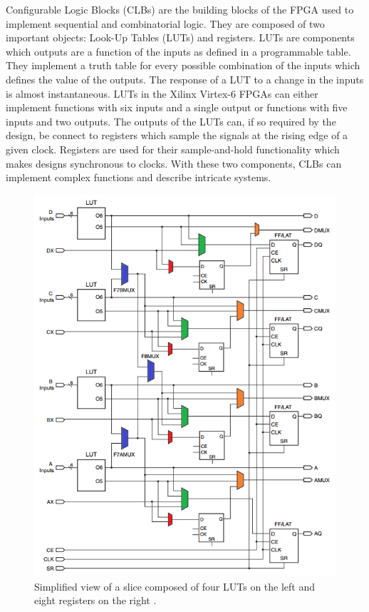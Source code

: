       Configurable Logic Blocks (CLBs) \cite{VIRTEX-CLB} are the building blocks of the FPGA used to implement sequential and combinatorial logic. They are composed of two important objects: Look-Up Tables (LUTs) and registers. LUTs are components which outputs are a function of the inputs as defined in a programmable table. They implement a truth table for every possible combination of the inputs which defines the value of the outputs. The response of a LUT to a change in the inputs is almost instantaneous. LUTs in the Xilinx Virtex-6 FPGAs can either implement functions with six inputs and a single output or functions with five inputs and two outputs. The outputs of the LUTs can, if so required by the design, be connect to registers which sample the signals at the rising edge of a given clock. Registers are used for their sample-and-hold functionality which makes designs synchronous to clocks. With these two components, CLBs can implement complex functions and describe intricate systems. \\

      \begin{figure}[p!]
        \centering
        \includegraphics[width=\textwidth]{img/II-5-irradiation/clb.png}
        \caption{Simplified view of a slice composed of four LUTs on the left and eight registers on the right \cite{VIRTEX-CLB}.}
        \label{fig:II-5-clb}
      \end{figure}

